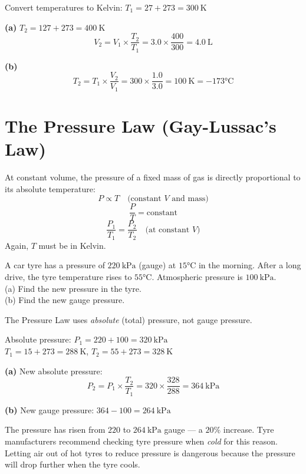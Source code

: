 \begin{solutionbox}
Convert temperatures to Kelvin:
$T_1 = 27 + 273 = 300\ \text{K}$

\textbf{(a)} $T_2 = 127 + 273 = 400\ \text{K}$
\[
  V_2 = V_1 \times \frac{T_2}{T_1}
  = 3.0 \times \frac{400}{300} = 4.0\ \text{L}
\]

\textbf{(b)}
\[
  T_2 = T_1 \times \frac{V_2}{V_1}
  = 300 \times \frac{1.0}{3.0} = 100\ \text{K}
  = -173°\text{C}
\]
\end{solutionbox}

\section{The Pressure Law (Gay-Lussac's Law)}

\begin{lawbox}
At constant volume, the pressure of a fixed mass of
gas is directly proportional to its absolute
temperature:
\[
  P \propto T
  \quad \text{(constant } V \text{ and mass)}
\]
\[
  \frac{P}{T} = \text{constant}
\]
\[
  \boxed{\frac{P_1}{T_1} = \frac{P_2}{T_2}}
  \quad \text{(at constant } V\text{)}
\]
Again, $T$ must be in Kelvin.
\end{lawbox}

\begin{examplebox}[14.3]
A car tyre has a pressure of $220\ \text{kPa}$
(gauge) at $15°\text{C}$ in the morning. After a
long drive, the tyre temperature rises to $55°\text{C}$.
Atmospheric pressure is $100\ \text{kPa}$.\\
(a) Find the new pressure in the tyre.\\
(b) Find the new gauge pressure.
\end{examplebox}

\begin{solutionbox}
The Pressure Law uses \textit{absolute} (total)
pressure, not gauge pressure.

Absolute pressure: $P_1 = 220 + 100 = 320\ \text{kPa}$\\
$T_1 = 15 + 273 = 288\ \text{K}$,
$T_2 = 55 + 273 = 328\ \text{K}$

\textbf{(a)} New absolute pressure:
\[
  P_2 = P_1 \times \frac{T_2}{T_1}
  = 320 \times \frac{328}{288}
  = 364\ \text{kPa}
\]

\textbf{(b)} New gauge pressure:
$364 - 100 = 264\ \text{kPa}$

The pressure has risen from $220$ to $264\ \text{kPa}$
gauge --- a $20\%$ increase. Tyre manufacturers
recommend checking tyre pressure when \textit{cold}
for this reason. Letting air out of hot tyres to
reduce pressure is dangerous because the pressure
will drop further when the tyre cools.
\end{solutionbox}


